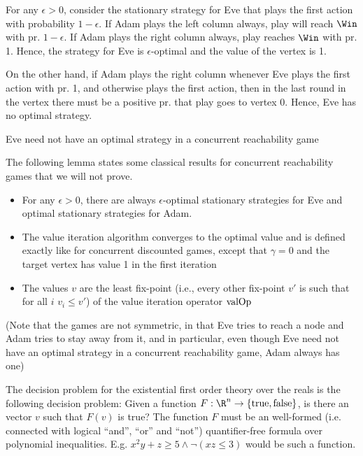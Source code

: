 For any $\epsilon>0$, consider the stationary strategy for Eve that plays the first action with probability $1-\epsilon$. 
If Adam plays the left column always, play will reach $\Win$ with pr. $1-\epsilon$. If Adam plays the right column always, play reaches $\Win$ with pr. 1. Hence, the strategy for Eve is $\epsilon$-optimal and the value of the vertex is 1.

On the other hand, if Adam plays the right column whenever Eve plays the first action with pr. 1, and otherwise plays the first action, 
then in the last round in the vertex there must be a positive pr. that play goes to vertex 0. Hence, Eve has no optimal strategy.


\begin{lemma}\label{lemm:no_opt_reach}
Eve need not have an optimal strategy in a concurrent reachability game
\end{lemma}

The following lemma states some classical results for concurrent reachability games that we will not prove.
\begin{lemma}\label{lemm:reach_class}
\begin{itemize}
\item For any $\epsilon>0$, there are always $\epsilon$-optimal stationary strategies for Eve and optimal stationary strategies for Adam. 
\item The value iteration algorithm converges to the optimal value and is defined exactly like for concurrent discounted games, except that $\gamma=0$ and the target vertex has value 1 in the first iteration
\item The values $v$ are the least fix-point (i.e., every other fix-point $v'$ is such that for all $i$ $v_i\leq v'$) of the value iteration operator $\text{valOp}$

\end{itemize}
\end{lemma}
(Note that the games are not symmetric, in that Eve tries to reach a node and Adam tries to stay away from it, and in particular, even though Eve need not have an optimal strategy in a concurrent reachability game, Adam always has one)






The decision problem for the existential first order theory over the reals is the following decision problem:
Given a function $F:\R^n\rightarrow \{\text{true},\text{false}\}$, is there an vector $v$ such that $F(v)$ is true?
The function $F$ must be an well-formed (i.e. connected with logical ``and'', ``or'' and ``not'') quantifier-free formula over polynomial inequalities.
E.g. $x^2y+z\geq 5\wedge \neg (xz\leq 3)$ would be such a function.


